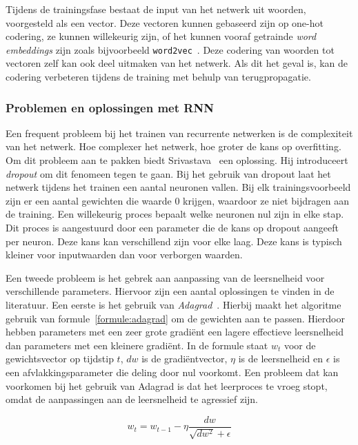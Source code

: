 Tijdens de trainingsfase bestaat de input van het netwerk uit woorden, voorgesteld als een vector. Deze vectoren kunnen gebaseerd zijn op one-hot codering, ze kunnen willekeurig zijn, of het kunnen vooraf getrainde \emph{word embeddings} zijn zoals bijvoorbeeld \texttt{word2vec}~\cite{Mikolov2013}. Deze codering van woorden tot vectoren zelf kan ook deel uitmaken van het netwerk. Als dit het geval is, kan de codering verbeteren tijdens de training met behulp van terugpropagatie.

\subsubsection{Problemen en oplossingen met RNN}

Een frequent probleem bij het trainen van recurrente netwerken is de complexiteit van het netwerk. Hoe complexer het netwerk, hoe groter de kans op overfitting. Om dit probleem aan te pakken biedt Srivastava~\cite{Srivastava2014} een oplossing. Hij introduceert \emph{dropout} om dit fenomeen tegen te gaan. Bij het gebruik van dropout laat het netwerk tijdens het trainen een aantal neuronen vallen. Bij elk trainingsvoorbeeld zijn er een aantal gewichten die waarde 0 krijgen, waardoor ze niet bijdragen aan de training. Een willekeurig proces bepaalt welke neuronen nul zijn in elke stap. Dit proces is aangestuurd door een parameter die de kans op dropout aangeeft per neuron. Deze  kans kan verschillend zijn voor elke laag. Deze kans is typisch kleiner voor inputwaarden dan voor verborgen waarden.

Een tweede probleem is het gebrek aan aanpassing van de leersnelheid voor verschillende parameters. Hiervoor zijn een aantal oplossingen te vinden in de literatuur. Een eerste is het gebruik van \emph{Adagrad}~\cite{Duchi2011}. Hierbij maakt het algoritme gebruik van formule~\eqref{formule:adagrad} om de gewichten aan te passen. Hierdoor hebben parameters met een zeer grote gradi\"ent een lagere effectieve leersnelheid dan parameters met een kleinere gradi\"ent. In de formule staat $w_t$ voor de gewichtsvector op tijdstip $t$, $dw$ is de gradi\"entvector, $\eta$ is de leersnelheid en $\epsilon$ is een afvlakkingsparameter die deling door nul voorkomt. Een probleem dat kan voorkomen bij het gebruik van Adagrad is dat het leerproces te vroeg stopt, omdat de aanpassingen aan de leersnelheid te agressief zijn.
 
\begin{equation}
    w_t = w_{t-1} - \eta \frac{dw}{\sqrt{dw^2} + \epsilon}
    \label{formule:adagrad}
\end{equation}

